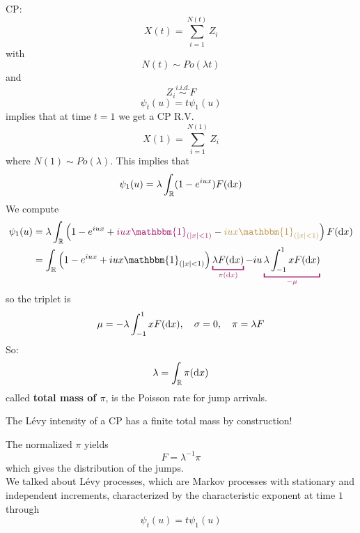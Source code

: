 \documentclass{article}
\begin{document}
	\begin{example}
		CP:
		\begin{equation*}
			X(t) = \sum_{i=1}^{N(t)} Z_i
		\end{equation*}
		with 
		\begin{equation*}
			N(t) \sim Po(\lambda t)
		\end{equation*}
		and 
		\begin{equation*}
			Z_i \stackrel{i.i.d.} \sim F
		\end{equation*}
		\begin{equation*}
			\psi_t(u) = t \psi_1(u)  
		\end{equation*}
		implies that at time $t=1$ we get a CP R.V.
		\begin{equation*}
			X(1) = \sum_{i=1}^{N(1)} Z_i
		\end{equation*}
		where $N(1) \sim Po(\lambda)$.
		This implies that 
		\begin{equation*}
			\psi_1(u) = \lambda \int_{\mathbb{R}} (1-e^{iux}) F(\mathop{}\!\mathrm{d} x)
		\end{equation*}
		We compute 
		\begin{align*}
			\psi_1(u) &= \lambda \int_\mR \left(1-e^{iux} + \textcolor{RedViolet}{iux \mathbbm{1}_{(|x| < 1)}} - \textcolor{Dandelion!70!black}{iux \mathbbm{1}_{(|x| < 1)}}\right)F(\dif x) \\
			&= \int_\mR \left(1-e^{iux} + iux\mathbbm{1}_{(|x| < 1)}\right)\color{RedViolet}\underbracket{\color{black}\lambda F(\dif x)}_{\color{RedViolet}\pi(\dif x)}\color{black} - iu\color{RedViolet}\underbracket{\color{black} \lambda \int_{-1}^1 x F(\dif x)}_{\color{RedViolet} -\mu}
		\end{align*}
		so the triplet is 
		\begin{equation*}
			\mu= -\lambda \int_{-1}^1 x F(\mathop{}\!\mathrm{d} x), \quad \sigma = 0, \quad \pi = \lambda F
		\end{equation*}
		So:
		\begin{equation*}
			\lambda = \int_{\mathbb{R}} \pi(\mathop{}\!\mathrm{d} x)
		\end{equation*}
		called \textbf{total mass of $\pi$}, is the Poisson rate for jump arrivals. \\
	\end{example}
	\begin{remark}
		The L\'evy intensity of a CP has a finite total mass by construction!
	\end{remark}
	The normalized $\pi$ yields 
	\begin{equation*}
		F = \lambda^{-1} \pi
	\end{equation*}
	which gives the distribution of the jumps. \\
	
	We talked about 
	L\'evy processes, which are Markov processes with stationary and independent increments, characterized by the characteristic exponent at time $1$ through 
	\begin{equation*}
		\psi_t(u) = t \psi_1(u)
	\end{equation*}
\end{document}
